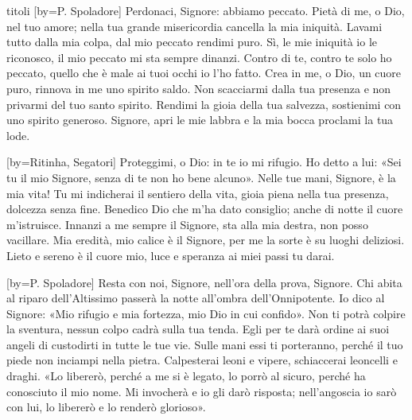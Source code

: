 \begin{songs}{titoli}
[by={P. Spoladore}]
\beginchorus
Perdonaci, Signore: abbiamo peccato. 
\endchorus
\beginverse
Pietà di me, o Dio, nel tuo amore; nella tua grande misericordia
cancella la mia iniquità.
Lavami tutto dalla mia colpa,
dal mio peccato rendimi puro.
\endverse
\beginverse
Sì, le mie iniquità io le riconosco,
il mio peccato mi sta sempre dinanzi.
Contro di te, contro te solo ho peccato,
quello che è male ai tuoi occhi io l'ho fatto.
\endverse
\beginverse
Crea in me, o Dio, un cuore puro,
rinnova in me uno spirito saldo.
Non scacciarmi dalla tua presenza
e non privarmi del tuo santo spirito.
\endverse
\beginverse
Rendimi la gioia della tua salvezza,
sostienimi con uno spirito generoso.
Signore, apri le mie labbra
e la mia bocca proclami la tua lode.
\endverse
\endsong

[by={Ritinha, Segatori}]
\beginverse
Proteggimi, o Dio: in te io mi rifugio.
Ho detto a lui: «Sei tu il mio Signore,
senza di te non ho bene alcuno».
Nelle tue mani, Signore, è la mia vita!
\endverse
\beginchorus
Tu mi indicherai il sentiero della vita,
gioia piena nella tua presenza,
dolcezza senza fine. 
\endchorus
\beginverse
Benedico Dio che m'ha dato consiglio;
anche di notte il cuore m'istruisce.
Innanzi a me sempre il Signore,
sta alla mia destra, non posso vacillare.
\endverse
\beginverse
Mia eredità, mio calice è il Signore,
per me la sorte è su luoghi deliziosi.
Lieto e sereno è il cuore mio,
luce e speranza ai miei passi tu darai.
\endverse
\endsong

[by={P. Spoladore}]
\beginchorus
Resta con noi, Signore, nell'ora della prova, Signore.
\endchorus
\beginverse
Chi abita al riparo dell'Altissimo
passerà la notte all'ombra dell'Onnipotente.
Io dico al Signore: «Mio rifugio e mia fortezza,
mio Dio in cui confido».
\endverse
\beginverse
Non ti potrà colpire la sventura,
nessun colpo cadrà sulla tua tenda.
Egli per te darà ordine ai suoi angeli
di custodirti in tutte le tue vie.
\endverse
\beginverse
Sulle mani essi ti porteranno,
perché il tuo piede non inciampi nella pietra.
Calpesterai leoni e vipere,
schiaccerai leoncelli e draghi.
\endverse
\beginverse
«Lo libererò, perché a me si è legato,
lo porrò al sicuro, perché ha conosciuto il mio nome.
Mi invocherà e io gli darò risposta; nell'angoscia io sarò con lui,
lo libererò e lo renderò glorioso».
\endverse
\endsong


\end{songs}
